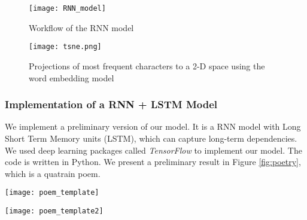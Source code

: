 \begin{figure}[htbp]
	\centering
	\texttt{[image: RNN\_model]}
	\caption{Workflow of the RNN model}
	\label{fig:rnn_workflow}
\end{figure}

\begin{figure}[htbp]
	\centering
	\texttt{[image: tsne.png]}
	\caption{Projections of most frequent characters to a 2-D space using the word embedding model}
	\label{fig:VSM}
\end{figure}
\subsubsection{ Implementation of a RNN + LSTM Model  }
We implement a preliminary version of our model. It is a RNN model with Long Short Term Memory units (LSTM), which can capture long-term dependencies.
%
We used deep learning packages called \emph{TensorFlow} \cite{tensorflow} to implement our model. The code is written in Python.
%
We present a preliminary result in Figure \ref{fig:poetry}, which is a quatrain poem.
\begin{figure*}[htbp]
	\centering
	\texttt{[image: poem\_template]}
	\caption{A Song Ci generated using LSTM}
	\label{fig:poetry}
\end{figure*}

\begin{figure*}[htbp]
	\centering
	\texttt{[image: poem\_template2]}
	\caption{A Song Ci generated using Genetic Algorithm }
	\label{fig:poetry}
\end{figure*}
